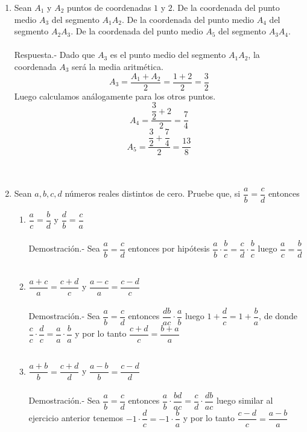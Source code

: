 \begin{enumerate}
    \item Sean $A_1$ y $A_2$ puntos de coordenadas $1$ y $2$. De la coordenada del punto medio $A_3$ del segmento $A_1 A_2$. De la coordenada del punto medio $A_4$ del segmento $A_2A_3$. De la coordenada del punto medio $A_5$ del segmento $A_3A_4$.\\\\
    Respuesta.-\; Dado que $A_3$ es el punto medio del segmento $A_1 A_2$, la coordenada $A_3$ será la media aritmética.
    $$A_3=\dfrac{A_1 + A_2}{2}=\dfrac{1+2}{2}=\dfrac{3}{2}$$
    Luego calculamos análogamente para los otros puntos.
    $$A_4=\dfrac{\dfrac{3}{2}+2}{2}=\dfrac{7}{4}$$
    $$A_5=\dfrac{\dfrac{3}{2}+\dfrac{7}{4}}{2}=\dfrac{13}{8}$$\\\\

    \item Sean $a,b,c,d$ números reales distintos de cero. Pruebe que, si $\dfrac{a}{b}=\dfrac{c}{d}$ entonces
    \begin{enumerate}[\bfseries a)]
	\item $\dfrac{a}{c}=\dfrac{b}{d}$ y $\dfrac{d}{b}=\dfrac{c}{a}$\\\\
	Demostración.-\; Sea $\dfrac{a}{b}=\dfrac{c}{d}$ entonces por hipótesis $\dfrac{a}{b}\cdot \dfrac{b}{c}=\dfrac{c}{d} \cdot \dfrac{b}{c}$ luego $\dfrac{a}{c}=\dfrac{b}{d}$\\\\ 

	\item $\dfrac{a+c}{a}=\dfrac{c+d}{c}$ y $\dfrac{a-c}{a}=\dfrac{c-d}{c}$\\\\
	Demostración.-\; Sea $\dfrac{a}{b}=\dfrac{c}{d}$ entonces $\dfrac{db}{ac}\cdot \dfrac{a}{b}$ luego $1+\dfrac{d}{c}=1+\dfrac{b}{a}$, de donde $\dfrac{c}{c}\cdot \dfrac{d}{c}=\dfrac{a}{a}\cdot \dfrac{b}{a}$ y por lo tanto $\dfrac{c+d}{c}=\dfrac{b+a}{a}$\\\\

	\item $\dfrac{a+b}{b}=\dfrac{c+d}{d}$ y $\dfrac{a-b}{b}=\dfrac{c-d}{d}$\\\\
	Demostración.-\; Sea $\dfrac{a}{b}=\dfrac{c}{d}$ entonces $\dfrac{a}{b}\cdot \dfrac{bd}{ac}=\dfrac{c}{d}\cdot \dfrac{db}{ac}$ luego similar al ejercicio anterior tenemos $-1 \cdot \dfrac{d}{c}=-1 \cdot \dfrac{b}{a}$ y por lo tanto $\dfrac{c-d}{c}=\dfrac{a-b}{a}$\\\\


\end{enumerate}
\end{enumerate}
